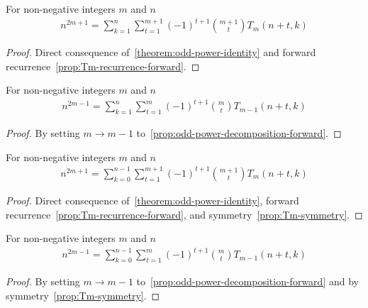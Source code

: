 \begin{proposition}
    \label{prop:odd-power-decomposition-forward}
    For non-negative integers $m$ and $n$
    \begin{align*}
        n^{2m+1} = \sum_{k=1}^{n} \sum_{t=1}^{m+1} (-1)^{t+1} \binom{m+1}{t} T_{m} (n+t, k)
    \end{align*}
    \begin{proof}
        Direct consequence of~\eqref{theorem:odd-power-identity}
        and forward recurrence~\eqref{prop:Tm-recurrence-forward}.
    \end{proof}
\end{proposition}

\begin{proposition}
    \label{prop:odd-power-decomposition-forward-m-1}
    For non-negative integers $m$ and $n$
    \begin{align*}
        n^{2m-1} = \sum_{k=1}^{n} \sum_{t=1}^{m} (-1)^{t+1} \binom{m}{t} T_{m-1} (n+t, k)
    \end{align*}
    \begin{proof}
        By setting $m \rightarrow m-1$ to~\eqref{prop:odd-power-decomposition-forward}.
    \end{proof}
\end{proposition}

\begin{proposition}
    \label{prop:odd-power-decomposition-forward-shifted}
    For non-negative integers $m$ and $n$
    \begin{align*}
        n^{2m+1} = \sum_{k=0}^{n-1} \sum_{t=1}^{m+1} (-1)^{t+1} \binom{m+1}{t} T_{m} (n+t, k)
    \end{align*}
    \begin{proof}
        Direct consequence of~\eqref{theorem:odd-power-identity},
        forward recurrence~\eqref{prop:Tm-recurrence-forward}, and symmetry~\eqref{prop:Tm-symmetry}.
    \end{proof}
\end{proposition}

\begin{proposition}
    \label{prop:odd-power-decomposition-forward-m-1-shifted}
    For non-negative integers $m$ and $n$
    \begin{align*}
        n^{2m-1} = \sum_{k=0}^{n-1} \sum_{t=1}^{m} (-1)^{t+1} \binom{m}{t} T_{m-1} (n+t, k)
    \end{align*}
    \begin{proof}
        By setting $m \rightarrow m-1$ to~\eqref{prop:odd-power-decomposition-forward} and
        by symmetry~\eqref{prop:Tm-symmetry}.
    \end{proof}
\end{proposition}


